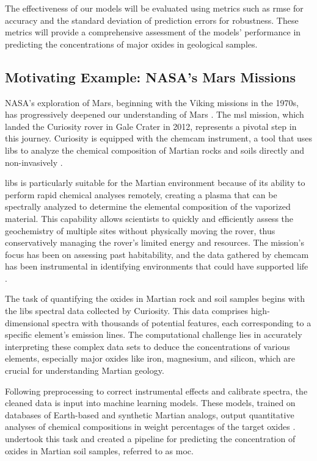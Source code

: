 The effectiveness of our models will be evaluated using metrics such as \gls{rmse} for accuracy and the standard deviation of prediction errors for robustness.
These metrics will provide a comprehensive assessment of the models' performance in predicting the concentrations of major oxides in geological samples.

\subsection{Motivating Example: NASA's Mars Missions}
NASA's exploration of Mars, beginning with the Viking missions in the 1970s, has progressively deepened our understanding of Mars \cite{marsnasagov_vikings}.
The \gls{msl} mission, which landed the Curiosity rover in Gale Crater in 2012, represents a pivotal step in this journey.
Curiosity is equipped with the \gls{chemcam} instrument, a tool that uses \gls{libs} to analyze the chemical composition of Martian rocks and soils directly and non-invasively \cite{chemcamNasaWebsite}.

\gls{libs} is particularly suitable for the Martian environment because of its ability to perform rapid chemical analyses remotely, creating a plasma that can be spectrally analyzed to determine the elemental composition of the vaporized material.
This capability allows scientists to quickly and efficiently assess the geochemistry of multiple sites without physically moving the rover, thus conservatively managing the rover's limited energy and resources.
The mission's focus has been on assessing past habitability, and the data gathered by \gls{chemcam} has been instrumental in identifying environments that could have supported life \cite{chemcamNasaWebsite, curiosityNasaWebsite}.

The task of quantifying the oxides in Martian rock and soil samples begins with the \gls{libs} spectral data collected by Curiosity.
This data comprises high-dimensional spectra with thousands of potential features, each corresponding to a specific element's emission lines.
The computational challenge lies in accurately interpreting these complex data sets to deduce the concentrations of various elements, especially major oxides like iron, magnesium, and silicon, which are crucial for understanding Martian geology.

Following preprocessing to correct instrumental effects and calibrate spectra, the cleaned data is input into machine learning models.
These models, trained on databases of Earth-based and synthetic Martian analogs, output quantitative analyses of chemical compositions in weight percentages of the target oxides \cite{wiensPreflightCalibrationInitial2013, cleggRecalibrationMarsScience2017}.
\citet{cleggRecalibrationMarsScience2017} undertook this task and created a pipeline for predicting the concentration of oxides in Martian soil samples, referred to as \gls{moc}.

